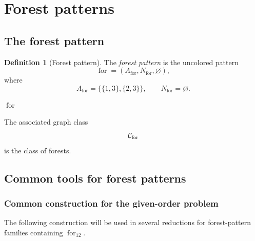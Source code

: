 \documentclass[12pt]{article}
\theoremstyle{plain}
\theoremstyle{definition}
\newtheorem{definition}[theorem]{Definition}
\theoremstyle{remark}
\theoremstyle{definition}
\newcommand{\forlabel}{\mathrm{for}}
\DeclareRobustCommand{\forname}{%
  \ensuremath{\mathop{\forlabel}\nolimits}%
}
\DeclareRobustCommand{\forparam}[1]{%
  \ensuremath{\mathop{\forlabel}\nolimits_{#1}}%
}
\begin{document}
\section{Forest patterns}
\label{sec:forest-patterns}

\subsection{The forest pattern}
\label{subsec:forest-pattern}

\begin{definition}[Forest pattern]
The \emph{forest pattern} is the uncolored pattern
\[
\forname=(A_{\forlabel},N_{\forlabel},\varnothing),
\]
where
\[
A_{\forlabel}
=
\bigl\{\{1,3\},\{2,3\}\bigr\},
\qquad
N_{\forlabel}
=
\varnothing.
\]
\end{definition}

\begin{center}

\smallskip
\(\forname\)
\end{center}

The associated graph class
\[
\mathcal C_{\forname}
\]
is the class of forests.





\subsection{Common tools for forest patterns}
\label{subsec:forest-common-tools}


\subsubsection{Common construction for the given-order problem}
\label{subsubsec:for-common-given-order}

The following construction will be used in several reductions for
forest-pattern families containing \(\forparam{12}\).
\end{document}
